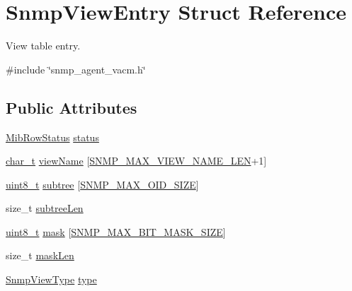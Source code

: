 \hypertarget{structSnmpViewEntry}{}\section{Snmp\+View\+Entry Struct Reference}
\label{structSnmpViewEntry}


View table entry.  




{\ttfamily \#include \char`\"{}snmp\+\_\+agent\+\_\+vacm.\+h\char`\"{}}

\subsection*{Public Attributes}
\begin{DoxyCompactItemize}
\item 
\hyperlink{mib__common_8h_a40ce1ea958f5c3b04f841d76f5557097}{Mib\+Row\+Status} \hyperlink{structSnmpViewEntry_a6eae2c4516db476272ac128113d0748b}{status}
\item 
\hyperlink{compiler__port_8h_a40bb5262bf908c328fbcfbe5d29d0201}{char\+\_\+t} \hyperlink{structSnmpViewEntry_a6ce36343aeaa16e8b824211598a769c5}{view\+Name} \mbox{[}\hyperlink{snmp__common_8h_a8188d8ada88e9fc2c0a6d2010105b14c}{S\+N\+M\+P\+\_\+\+M\+A\+X\+\_\+\+V\+I\+E\+W\+\_\+\+N\+A\+M\+E\+\_\+\+L\+EN}+1\mbox{]}
\item 
\hyperlink{stdint_8h_aba7bc1797add20fe3efdf37ced1182c5}{uint8\+\_\+t} \hyperlink{structSnmpViewEntry_a640a3c23d13bbf9de16ebf23097abc12}{subtree} \mbox{[}\hyperlink{snmp__common_8h_a7eee56441ee1b961702e8b4cbe9586a7}{S\+N\+M\+P\+\_\+\+M\+A\+X\+\_\+\+O\+I\+D\+\_\+\+S\+I\+ZE}\mbox{]}
\item 
size\+\_\+t \hyperlink{structSnmpViewEntry_a0b1d281049f1ea869ecb6a7af5a01cb1}{subtree\+Len}
\item 
\hyperlink{stdint_8h_aba7bc1797add20fe3efdf37ced1182c5}{uint8\+\_\+t} \hyperlink{structSnmpViewEntry_a692738ca6f958b97c6c1b9b58e2f5e91}{mask} \mbox{[}\hyperlink{snmp__common_8h_a3f142408a36a20aa0c4214559ff23903}{S\+N\+M\+P\+\_\+\+M\+A\+X\+\_\+\+B\+I\+T\+\_\+\+M\+A\+S\+K\+\_\+\+S\+I\+ZE}\mbox{]}
\item 
size\+\_\+t \hyperlink{structSnmpViewEntry_a6f23a9a82dcf611acc03489e9e812fbe}{mask\+Len}
\item 
\hyperlink{snmp__agent__vacm_8h_af9211ac922f85ec38c917879483643aa}{Snmp\+View\+Type} \hyperlink{structSnmpViewEntry_a32a9315f088375a8cd408ded58a20021}{type}
\end{DoxyCompactItemize}


